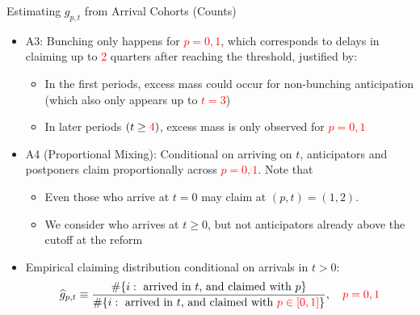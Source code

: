 \begin{frame}[label=gp_est]{Estimating $g_{p,t}$ from Arrival Cohorts (Counts)}
\begin{itemize}
    \item A3: Bunching only happens for \textcolor{red}{$p=0,1$}, which corresponds to delays in claiming up to \textcolor{red}{2} quarters after reaching the threshold, justified by:
        \begin{itemize}
            \item In the first periods, excess mass could occur for non-bunching anticipation (which also only appears up to \textcolor{red}{$t=3$})
            \item In later periods $(t\geq \textcolor{red}{4})$, excess mass is only observed for \textcolor{red}{$p=0,1$}
        \end{itemize}
    \item A4 (Proportional Mixing): Conditional on arriving on $t$, anticipators and postponers claim proportionally across \textcolor{red}{$p=0,1$}. Note that
    \begin{itemize}
        \item Even those who arrive at $t=0$ may claim  at $(p,t)=(1,2)$.
        \item We consider who arrives at $t\geq 0$, but not anticipators already above the cutoff at the reform
    \end{itemize}
    \item Empirical claiming distribution conditional on arrivals in $t>0$:
    \[
        \widehat{ g}_{p,t}\equiv
        \frac{\#\{i:\text{ arrived in } t\text{, and claimed with }p\}}
             {\#\{i:\text{ arrived in } t\text{, and claimed with }\textcolor{red}{p\in [0,1]}\}},
        \quad \textcolor{red}{p=0,1}
    \]
\end{itemize}
\end{frame}

